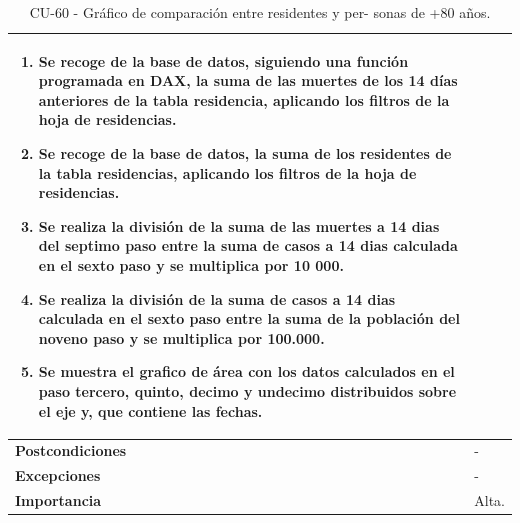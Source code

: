 \begin{table}[ht!]
{\begin{tabular}{|l|l|}
{\begin{enumerate}
                 \item Se recoge de la base de datos, siguiendo una función programada en DAX, la suma de las muertes de los 14 días anteriores de la tabla residencia, aplicando los filtros de la hoja de residencias.
                 \item Se recoge de la base de datos, la suma de los residentes de la tabla residencias, aplicando los filtros de la hoja de residencias.
                 \item Se realiza la división de la suma de las muertes a 14 dias del septimo paso entre la suma de casos a 14 dias calculada en el sexto paso y se multiplica por 10 000.        
                 \item Se realiza la división de la suma de casos a 14 dias calculada en el sexto paso entre la suma de la población del noveno paso  y se multiplica por 100.000.
                 \item Se muestra el grafico de área con los datos calculados en el paso tercero, quinto, decimo y undecimo distribuidos sobre el eje y, que contiene las fechas.
            \end{enumerate}} \\ \hline
         \textbf{Postcondiciones}       & - \\ \hline
         \textbf{Excepciones}       & - \\ \hline
         \textbf{Importancia}   & Alta. \\
         \hline
    \end{tabular}}
    \caption{CU-60 - Gráfico de comparación entre residentes y per-
sonas de +80 años.}
    \label{tab:my_label}
\end{table}
